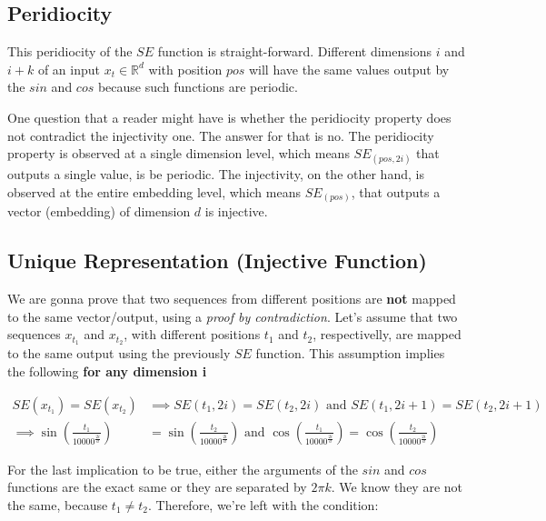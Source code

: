 \documentclass{article}
\begin{document}
\subsection{Peridiocity}

This peridiocity of the $SE$ function is straight-forward. Different dimensions $i$ and $i+k$ of an input  $x_t \in \mathbb{R}^{d}$ with position $pos$ will have the same values output by the $sin$ and $cos$ because such functions are periodic. 

\begin{info} %
	One question that a reader might have is whether the peridiocity property does not contradict the injectivity one. The answer for that is no. The peridiocity property is observed at a single dimension level, which means $SE_{(pos, 2i)}$ that outputs a single value, is be periodic. The injectivity, on the other hand, is observed at the entire embedding level, which means $SE_{(pos)}$, that outputs a vector (embedding) of dimension $d$ is injective.
\end{info}


\subsection{Unique Representation (Injective Function)}

We are gonna prove that two sequences from different positions are \textbf{not} mapped to the same vector/output, using a \textit{proof by contradiction}. 
Let's assume that two sequences $x_{t_1}$ and $x_{t_2}$, with different positions $t_1$ and $t_2$, respectivelly, are mapped to the same output using the previously  $SE$ function. This assumption implies the following \textbf{for any dimension i}

\begin{align}
	SE(x_{t_1}) = SE(x_{t_2}) & \implies SE(t_1, 2i) = SE(t_2, 2i) \text{   and   }SE(t_1, 2i+1) = SE(t_2, 2i+1) \\
	 \implies \sin\left(\frac{t_1}{10000^{\frac{2i}{d}}}\right) &= \sin\left(\frac{t_2}{10000^{\frac{2i}{d}}}\right) \text{   and   }\cos\left(\frac{t_1}{10000^{\frac{2i}{d}}}\right) = \cos\left(\frac{t_2}{10000^{\frac{2i}{d}}}\right) 
\end{align}


For the last implication to be true, either the arguments of the $sin$ and $cos$ functions are the exact same or they are separated by $2\pi k$. We know they are not the same, because $t_1 \neq t_2$. Therefore, we're left with the condition:
\end{document}
